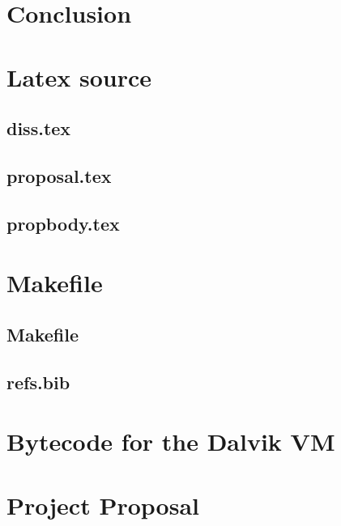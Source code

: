 \documentclass[12pt,twoside,notitlepage]{report}
\begin{document}
\cleardoublepage
\chapter{Conclusion}



\cleardoublepage



\cleardoublepage

\appendix

\chapter{Latex source}

\section{diss.tex}
{\scriptsize}

\section{proposal.tex}
{\scriptsize}

\section{propbody.tex}
{\scriptsize}



\cleardoublepage

\chapter{Makefile}

\section{\label{makefile}Makefile}
{\scriptsize}

\section{refs.bib}
{\scriptsize}


\cleardoublepage

\chapter{Bytecode for the Dalvik VM}

% 


\cleardoublepage

\chapter{Project Proposal}


\end{document}

